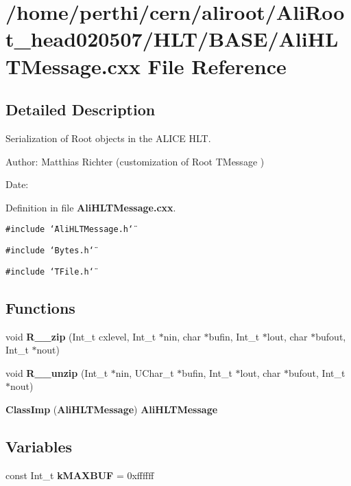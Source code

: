 \section{/home/perthi/cern/aliroot/Ali\-Root\_\-head020507/HLT/BASE/Ali\-HLTMessage.cxx File Reference}
\label{AliHLTMessage_8cxx}


\subsection{Detailed Description}
Serialization of Root objects in the ALICE HLT. 

\begin{Desc}
\item[Author:]Matthias Richter (customization of Root TMessage ) \end{Desc}
\begin{Desc}
\item[Date:]\end{Desc}


Definition in file {\bf Ali\-HLTMessage.cxx}.

{\tt \#include \char`\"{}Ali\-HLTMessage.h\char`\"{}}\par
{\tt \#include \char`\"{}Bytes.h\char`\"{}}\par
{\tt \#include \char`\"{}TFile.h\char`\"{}}\par
\subsection*{Functions}
\begin{CompactItemize}
\item 
void {\bf R\_\-\_\-zip} (Int\_\-t cxlevel, Int\_\-t $\ast$nin, char $\ast$bufin, Int\_\-t $\ast$lout, char $\ast$bufout, Int\_\-t $\ast$nout)
\item 
void {\bf R\_\-\_\-unzip} (Int\_\-t $\ast$nin, UChar\_\-t $\ast$bufin, Int\_\-t $\ast$lout, char $\ast$bufout, Int\_\-t $\ast$nout)
\item 
{\bf Class\-Imp} ({\bf Ali\-HLTMessage}) {\bf Ali\-HLTMessage}
\end{CompactItemize}
\subsection*{Variables}
\begin{CompactItemize}
\item 
const Int\_\-t {\bf k\-MAXBUF} = 0xffffff
\end{CompactItemize}


